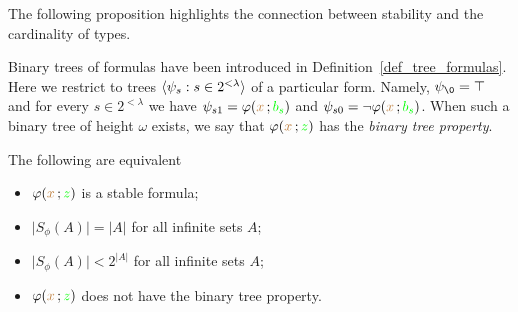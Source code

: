 \documentclass[creche.tex]{subfiles}
\begin{document}
The following proposition highlights the connection between stability and the cardinality of types. 

Binary trees of formulas have been introduced in Definition~\ref{def_tree_formulas}. Here we restrict to trees $\langle\psi_s:s\in 2^{<\lambda}\rangle$ of a particular form. Namely, $\psi_\0=\top$ and for every $s\in 2^{<\lambda}$ we have $\psi_{s1}=\varphi({\color{brown} x}\,;{\color{green} b_s})$ and $\psi_{s0}=\neg\varphi({\color{brown} x}\,;{\color{green} b_s})$. When such a binary tree of height $\omega$ exists, we say that $\varphi({\color{brown} x}\,;{\color{green} z})$ has the \emph{binary tree property}.

\begin{proposition}\label{prop_count_types}
The following are equivalent
\begin{itemize}
\item[1.] $\varphi({\color{brown} x}\,;{\color{green} z})$ is a stable formula;
\item[2.] $\big|S_{\phi}(A)\big|=|A|$ for all infinite sets $A$;
\item[3.] $\big|S_{\phi}(A)\big|<2^{|A|}$ for all infinite sets $A$;
\item[4.] $\varphi({\color{brown} x}\,;{\color{green} z})$ does not have the binary tree property.
\end{itemize}
\end{proposition}

\def\ceq#1#2#3{\parbox[t]{15ex}{$\displaystyle #1$}\medrel{#2}$\displaystyle  #3$}
\end{document}
